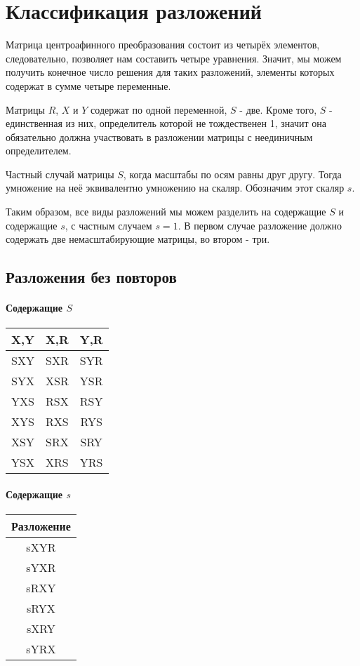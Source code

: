 \section{Классификация разложений}

Матрица центроафинного преобразования состоит из четырёх элементов, следовательно, позволяет нам составить четыре уравнения. Значит, мы можем получить конечное число решения для таких разложений, элементы которых содержат в сумме четыре переменные.

Матрицы $R$, $X$ и $Y$ содержат по одной переменной, $S$ - две. Кроме того, $S$ - единственная из них, определитель которой не тождественен 1, значит она обязательно должна участвовать в разложении матрицы с неединичным определителем.

Частный случай матрицы $S$, когда масштабы по осям равны друг другу. Тогда умножение на неё эквивалентно умножению на скаляр. Обозначим этот скаляр $s$.

Таким образом, все виды разложений мы можем разделить на содержащие $S$ и содержащие $s$, с частным случаем $s = 1$.
В первом случае разложение должно содержать две немасштабирующие матрицы, во втором - три.

 

\subsection{Разложения без повторов}

\paragraph{Содержащие $S$}

\begin{tabular}{|c|c|c|}
\hline
X,Y & X,R & Y,R \\
\hline
	SXY & SXR & SYR \\
	SYX & XSR & YSR \\
	YXS & RSX & RSY \\
	XYS & RXS & RYS \\
	XSY & SRX & SRY \\
	YSX & XRS & YRS \\
\hline
\end{tabular}

\paragraph{Содержащие $s$}

\begin{tabular}{|c|}
\hline
Разложение \\
\hline
 sXYR \\
 sYXR \\
 sRXY \\
 sRYX \\
 sXRY \\
 sYRX \\
\hline
\end{tabular}

